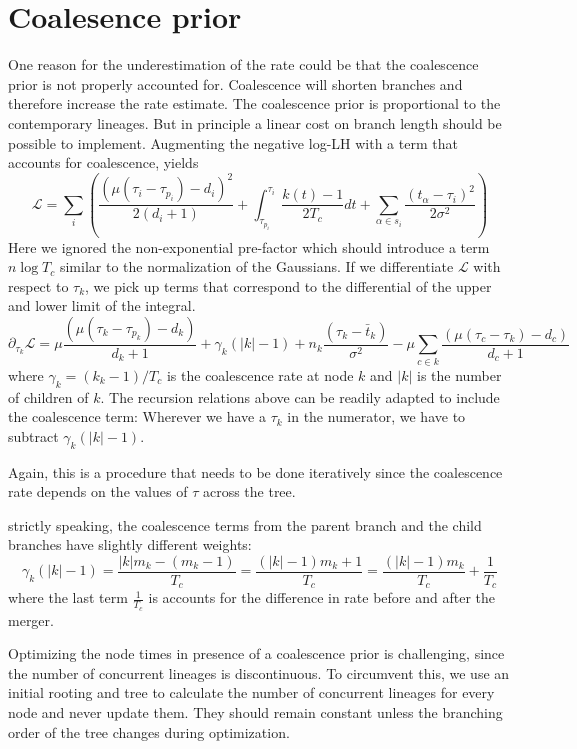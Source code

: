 \documentclass[aps,rmp, onecolumn]{revtex4}
\newcommand{\LH}{\mathcal{L}}
\begin{document}
\section*{Coalesence prior}
One reason for the underestimation of the rate could be that the coalescence prior is not properly accounted for.
Coalescence will shorten branches and therefore increase the rate estimate.
The coalescence prior is proportional to the contemporary lineages. But in principle a linear cost on branch length should be possible to implement.
Augmenting the negative log-LH with a term that accounts for coalescence, yields
\begin{equation}
    \LH  = \sum_i \left(\frac{(\mu(\tau_i - \tau_{p_i}) - d_i)^2}{2(d_i+1)} + \int_{\tau_{p_i}}^{\tau_i}\frac{k(t)-1}{2T_c}dt  + \sum_{\alpha \in s_i} \frac{(t_\alpha-\tau_i)^2}{2\sigma^2} \right)
\end{equation}
Here we ignored the non-exponential pre-factor which should introduce a term $n\log T_c$ similar to the normalization of the Gaussians.
If we differentiate $\LH$ with respect to $\tau_k$, we pick up terms that correspond to the differential of the upper and lower limit of the integral.
\begin{equation}
    \partial_{\tau_k} \LH  =\mu\frac{(\mu(\tau_k - \tau_{p_k}) -  d_k)}{d_k+1}  + \gamma_k(|k| - 1) +  n_k\frac{(\tau_k-\bar{t}_k)}{\sigma^2} -  \mu\sum_{c\in k} \frac{(\mu(\tau_{c} - \tau_{k}) - d_c)}{d_c+1}
\end{equation}
where $\gamma_k = (k_k-1)/T_c$ is the coalescence rate at node $k$ and $|k|$ is the number of children of $k$.
The recursion relations above can be readily adapted to include the coalescence term:
Wherever we have a $\tau_k$ in the numerator, we have to subtract $\gamma_k(|k|-1)$.

Again, this is a procedure that needs to be done iteratively since the coalescence rate depends on the values of $\tau$ across the tree.

strictly speaking, the coalescence terms from the parent branch and the child branches have slightly different weights:
\begin{equation}
    \gamma_k(|k| - 1) = \frac{|k|m_k - (m_k - 1)}{T_c} = \frac{(|k| - 1)m_k + 1}{T_c} = \frac{(|k| - 1)m_k}{T_c} + \frac{1}{T_c}
\end{equation}
where the last term $\frac{1}{T_c}$ is accounts for the difference in rate before and after the merger.

Optimizing the node times in presence of a coalescence prior is challenging, since the number of concurrent lineages is discontinuous.
To circumvent this, we use an initial rooting and tree to calculate the number of concurrent lineages for every node and never update them. They should remain constant unless the branching order of the tree changes during optimization.
\end{document}
